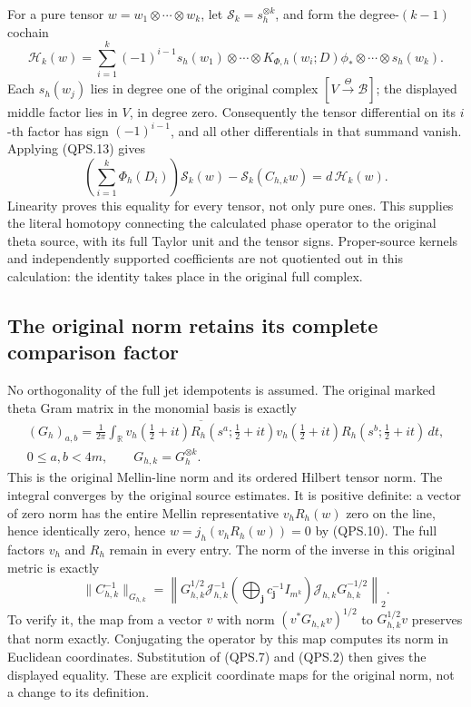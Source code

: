 For a pure tensor \(w=w_1\otimes\cdots\otimes w_k\), let
\(\mathcal S_k=s_h^{\otimes k}\), and form the degree-\((k-1)\)
cochain
\[
 \mathcal H_k(w)=
 \sum_{i=1}^k(-1)^{i-1}
 s_h(w_1)\otimes\cdots\otimes
 K_{\Phi,h}(w_i;D)\phi_*\otimes\cdots\otimes s_h(w_k).
 \tag{QPS.14}
\]
Each \(s_h(w_j)\) lies in degree one of the original complex
\([V\xrightarrow{\Theta}\mathscr B]\); the displayed middle factor
lies in \(V\), in degree zero. Consequently the tensor differential
on its \(i\)-th factor has sign \((-1)^{i-1}\), and all other
differentials in that summand vanish. Applying (QPS.13) gives
\[
 \left(\sum_{i=1}^k\Phi_h(D_i)\right)\mathcal S_k(w)
           -\mathcal S_k(C_{h,k}w)
       =d\,\mathcal H_k(w).
 \tag{QPS.15}
\]
Linearity proves this equality for every tensor, not only pure ones.
This supplies the literal homotopy connecting the calculated phase
operator to the original theta source, with its full Taylor unit
and the tensor signs. Proper-source kernels and independently
supported coefficients are not quotiented out in this calculation:
the identity takes place in the original full complex.

\subsection{The original norm retains its complete comparison factor}

No orthogonality of the full jet idempotents is assumed. The original
marked theta Gram matrix in the monomial basis is exactly
\[
 \begin{gathered}
 (G_h)_{a,b}=\frac1{2\pi}\int_{\mathbb R}
 \overline{v_h(\tfrac12+it)R_h(s^a;\tfrac12+it)}
 v_h(\tfrac12+it)R_h(s^b;\tfrac12+it)\,dt,\\
 0\leq a,b<4m,\qquad G_{h,k}=G_h^{\otimes k}.
 \end{gathered}
 \tag{QPS.16}
\]
This is the original Mellin-line norm and its ordered Hilbert tensor
norm. The integral converges by the original source estimates.
It is positive definite: a vector of zero norm has the entire
Mellin representative \(v_hR_h(w)\) zero on the line, hence
identically zero, hence \(w=j_h(v_hR_h(w))=0\) by (QPS.10).
The full factors \(v_h\) and \(R_h\) remain in every entry.
The norm of the inverse in this original metric is exactly
\[
 \|C_{h,k}^{-1}\|_{G_{h,k}}
 =\left\|
 G_{h,k}^{1/2}\mathcal J_{h,k}^{-1}
 \left(\bigoplus_{\mathbf j}c_{\mathbf j}^{-1}I_{m^k}\right)
 \mathcal J_{h,k}G_{h,k}^{-1/2}
 \right\|_2.
 \tag{QPS.17}
\]
To verify it, the map from a vector \(v\) with norm
\((v^*G_{h,k}v)^{1/2}\) to \(G_{h,k}^{1/2}v\) preserves that norm
exactly. Conjugating the operator by this map computes its norm
in Euclidean coordinates. Substitution of (QPS.7) and (QPS.2)
then gives the displayed equality. These are explicit coordinate
maps for the original norm, not a change to its definition.

